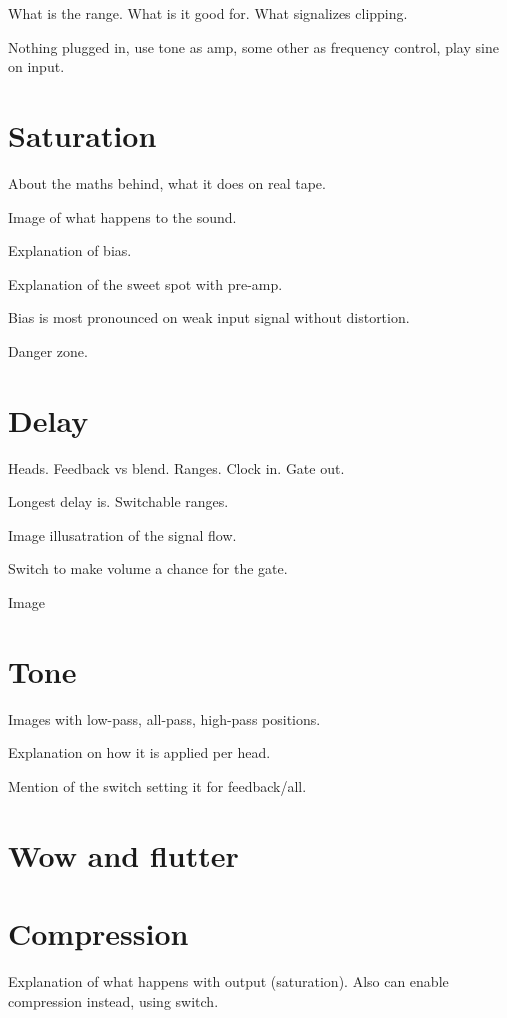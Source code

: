 \documentclass[11pt]{article}
\begin{document}
What is the range. What is it good for. What signalizes clipping.

Nothing plugged in, use tone as amp, some other as frequency control, play sine on input.

\section{Saturation}

About the maths behind, what it does on real tape.

Image of what happens to the sound.

Explanation of bias.

Explanation of the sweet spot with pre-amp.

Bias is most pronounced on weak input signal without distortion.

Danger zone.

\section{Delay}

Heads. Feedback vs blend. Ranges. Clock in. Gate out.

Longest delay is. Switchable ranges.

Image illusatration of the signal flow.

Switch to make volume a chance for the gate.

Image 

\section{Tone}

Images with low-pass, all-pass, high-pass positions.

Explanation on how it is applied per head.

Mention of the switch setting it for feedback/all.

\section{Wow and flutter}

\section{Compression}

Explanation of what happens with output (saturation). Also can enable compression instead, using switch.
\end{document}
